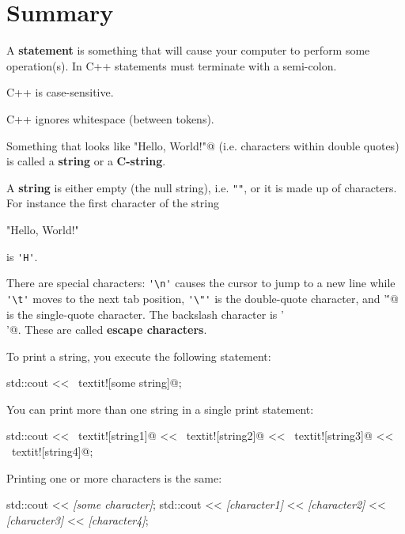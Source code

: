 \newpage\section{Summary}

A \textbf{statement} 
is something that will cause your computer to perform some operation(s). 
In C++ statements must terminate with a semi-colon.

C++ is case-sensitive. 

C++ ignores whitespace (between tokens).

Something that looks like 
\verb@"Hello, World!\n"@ 
(i.e. characters within double quotes) is called a 
\textbf{string} or a 
\textbf{C-string}.

A \textbf{string} is either empty (the null string), 
i.e. \verb!""!, or it is made up of characters. 
For instance the first character of the string
\begin{console}[frame=none]
 
    "Hello, World!\n"

\end{console}
is \verb!'H'!.

There are special characters: 
\verb!'\n'! causes the cursor to jump to a new line while 
\verb!'\t'! moves to the next tab position, 
\verb!'\"'! is the double-quote character, 
and \verb@'\''@ is the single-quote character. 
The backslash character is \verb@'\\'@. 
These are called \textbf{escape characters}.

To print a string, you execute the following statement:
\begin{console}[frame=none, commandchars=\~\!\@]

        std::cout << ~textit![some string]@;

\end{console}
You can print more than one string in a single print statement:
\begin{console}[frame=none, commandchars=\~\!\@]

        std::cout << ~textit![string1]@ << ~textit![string2]@
                  << ~textit![string3]@ << ~textit![string4]@;

\end{console}
Printing one or more characters is the same:
\begin{console}[frame=none, commandchars=\\\{\}]

        std::cout << \textit{[some character]};
        std::cout << \textit{[character1]} << \textit{[character2]}
                  << \textit{[character3]} << \textit{[character4]};

\end{console}

